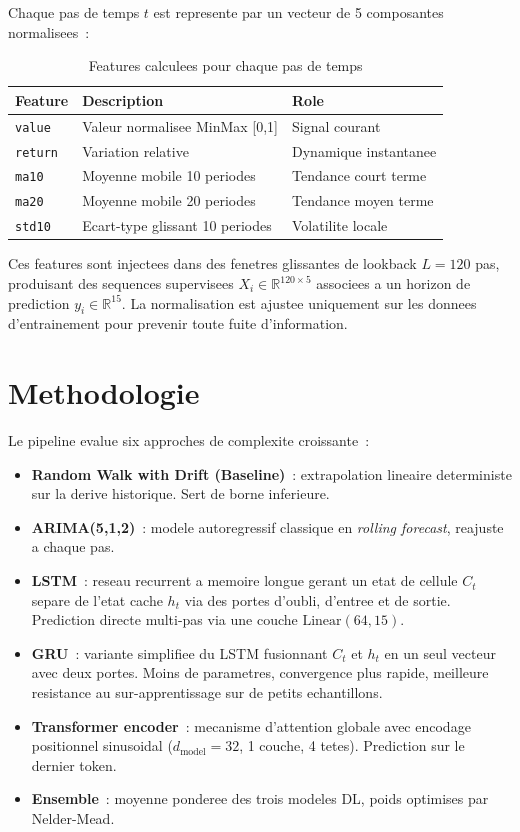 \documentclass[12pt, a4paper]{article}
\begin{document}
Chaque pas de temps $t$ est represente par un vecteur de 5 composantes normalisees~:
\begin{table}[H]
\centering
\caption{Features calculees pour chaque pas de temps}
\begin{tabular}{lll}
\toprule
\textbf{Feature} & \textbf{Description} & \textbf{Role} \\
\midrule
\texttt{value}  & Valeur normalisee MinMax [0,1] & Signal courant \\
\texttt{return} & Variation relative & Dynamique instantanee \\
\texttt{ma10}   & Moyenne mobile 10 periodes & Tendance court terme \\
\texttt{ma20}   & Moyenne mobile 20 periodes & Tendance moyen terme \\
\texttt{std10}  & Ecart-type glissant 10 periodes & Volatilite locale \\
\bottomrule
\end{tabular}
\end{table}

Ces features sont injectees dans des fenetres glissantes de lookback $L = 120$ pas, produisant des sequences supervisees $X_i \in \mathbb{R}^{120 \times 5}$ associees a un horizon de prediction $y_i \in \mathbb{R}^{15}$. La normalisation est ajustee uniquement sur les donnees d'entrainement pour prevenir toute fuite d'information.

\section{Methodologie}

Le pipeline evalue six approches de complexite croissante~:

\begin{itemize}
  \item \textbf{Random Walk with Drift (Baseline)}~: extrapolation lineaire deterministe sur la derive historique. Sert de borne inferieure.
  \item \textbf{ARIMA(5,1,2)}~: modele autoregressif classique en \textit{rolling forecast}, reajuste a chaque pas.
  \item \textbf{LSTM}~: reseau recurrent a memoire longue gerant un etat de cellule $C_t$ separe de l'etat cache $h_t$ via des portes d'oubli, d'entree et de sortie. Prediction directe multi-pas via une couche $\text{Linear}(64, 15)$.
  \item \textbf{GRU}~: variante simplifiee du LSTM fusionnant $C_t$ et $h_t$ en un seul vecteur avec deux portes. Moins de parametres, convergence plus rapide, meilleure resistance au sur-apprentissage sur de petits echantillons.
  \item \textbf{Transformer encoder}~: mecanisme d'attention globale avec encodage positionnel sinusoidal ($d_\text{model} = 32$, 1 couche, 4 tetes). Prediction sur le dernier token.
  \item \textbf{Ensemble}~: moyenne ponderee des trois modeles DL, poids optimises par Nelder-Mead.
\end{itemize}
\end{document}
